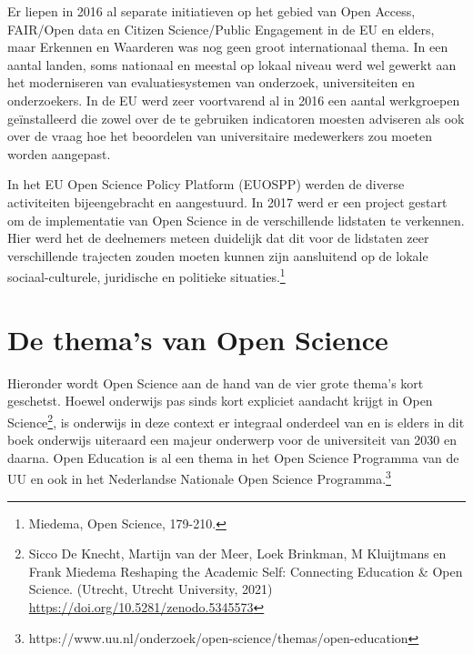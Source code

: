 \documentclass{jote-book}
\begin{document}
	Er liepen in 2016 al separate initiatieven op het gebied van Open Access, FAIR/Open data en Citizen Science/Public Engagement in de EU en elders, maar Erkennen en Waarderen was nog geen groot internationaal thema. In een aantal landen, soms nationaal en meestal op lokaal niveau werd wel gewerkt aan het moderniseren van evaluatiesystemen van onderzoek, universiteiten en onderzoekers. In de EU werd zeer voortvarend al in 2016 een aantal werkgroepen geïnstalleerd die zowel over de te gebruiken indicatoren moesten adviseren als ook over de vraag hoe het beoordelen van universitaire medewerkers zou moeten worden aangepast.



	In het EU Open Science Policy Platform (EUOSPP) werden de diverse activiteiten bijeengebracht en aangestuurd. In 2017 werd er een project gestart om de implementatie van Open Science in de verschillende lidstaten te verkennen. Hier werd het de deelnemers meteen duidelijk dat dit voor de lidstaten zeer verschillende trajecten zouden moeten kunnen zijn aansluitend op de lokale sociaal-culturele, juridische en politieke situaties.\footnote{Miedema, Open Science, 179-210.}



	\section{De thema's van Open Science}



	Hieronder wordt Open Science aan de hand van de vier grote thema's kort geschetst. Hoewel onderwijs pas sinds kort expliciet aandacht krijgt in Open Science\footnote{Sicco De Knecht, Martijn van der Meer, Loek Brinkman, M Kluijtmans en Frank Miedema Reshaping the Academic Self: Connecting Education \& Open Science. (Utrecht, Utrecht University, 2021) \href{https://doi.org/10.5281/zenodo.5345573}{https://doi.org/10.5281/zenodo.5345573} }, is onderwijs in deze context er integraal onderdeel van en is elders in dit boek onderwijs uiteraard een majeur onderwerp voor de universiteit van 2030 en daarna. Open Education is al een thema in het Open Science Programma van de UU en ook in het Nederlandse Nationale Open Science Programma.\footnote{https://www.uu.nl/onderzoek/open-science/themas/open-education}
\end{document}
